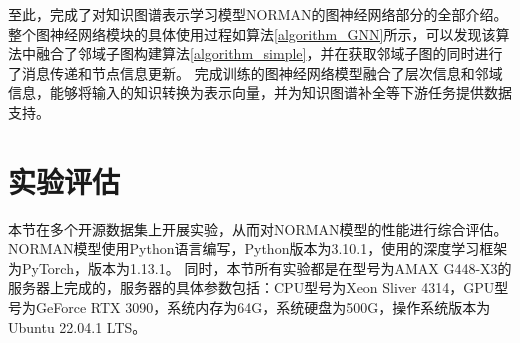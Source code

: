 \documentclass[algorithmlist, AutoFakeBold, AutoFakeSlant, figurelist, tablelist, nomlist, engineering, openany]{seuthesix} %
\begin{document}
至此，完成了对知识图谱表示学习模型NORMAN的图神经网络部分的全部介绍。
整个图神经网络模块的具体使用过程如算法\ref{algorithm_GNN}所示，可以发现该算法中融合了邻域子图构建算法\ref{algorithm_simple}，并在获取邻域子图的同时进行了消息传递和节点信息更新。
完成训练的图神经网络模型融合了层次信息和邻域信息，能够将输入的知识转换为表示向量，并为知识图谱补全等下游任务提供数据支持。


\section{实验评估}
本节在多个开源数据集上开展实验，从而对NORMAN模型的性能进行综合评估。
NORMAN模型使用Python语言编写，Python版本为3.10.1，使用的深度学习框架为PyTorch，版本为1.13.1。
同时，本节所有实验都是在型号为AMAX G448-X3的服务器上完成的，服务器的具体参数包括：CPU型号为Xeon Sliver 4314，GPU型号为GeForce RTX 3090，系统内存为64G，系统硬盘为500G，操作系统版本为Ubuntu 22.04.1 LTS。
\end{document}
